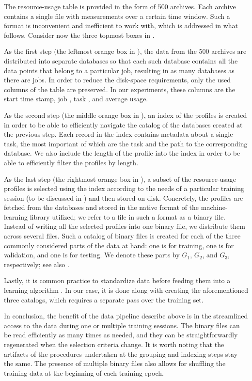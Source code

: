 The resource-usage table is provided in the form of 500 archives. Each archive
contains a single file with measurements over a certain time window. Such a
format is inconvenient and inefficient to work with, which is addressed in what
follows. Consider now the three topmost boxes in .

As the first step (the leftmost orange box in ), the data
from the 500 archives are distributed into separate databases so that each such
database contains all the data points that belong to a particular job, resulting
in as many databases as there are jobs. In order to reduce the disk-space
requirements, only the used columns of the table are preserved. In our
experiments, these columns are the start time stamp, job , task ,
and average  usage.

As the second step (the middle orange box in ), an index of
the profiles is created in order to be able to efficiently navigate the catalog
of the databases created at the previous step. Each record in the index contains
metadata about a single task, the most important of which are the task 
and the path to the corresponding database. We also include the length of the
profile into the index in order to be able to efficiently filter the profiles by
length.

As the last step (the rightmost orange box in ), a subset
of the resource-usage profiles is selected using the index according to the
needs of a particular training session (to be discussed in )
and then stored on disk. Concretely, the profiles are fetched from the databases
and stored in the native format of the machine-learning library utilized; we
refer to a file in such a format as a binary file. Instead of writing all the
selected profiles into one binary file, we distribute them across several files.
Such a catalog of binary files is created for each of the three commonly
considered parts \cite{hastie2013} of the data at hand: one is for training, one
is for validation, and one is for testing. We denote these parts by $G_1$,
$G_2$, and $G_3$, respectively; see also .

Lastly, it is common practice to standardize data before feeding them into a
learning algorithm \cite{hastie2013}. In our case, it is done along with
creating the aforementioned three catalogs, which requires a separate pass over
the training set.

In conclusion, the benefit of the data pipeline describe above is in the
streamlined access to the data during one or multiple training sessions. The
binary files can be read efficiently as many times as needed, and they can be
straightforwardly regenerated when the selection criteria change. It is worth
noting that the artifacts of the procedures undertaken at the grouping and
indexing steps stay the same. The presence of multiple binary files also allows
for shuffling the training data at the beginning of each training epoch.

